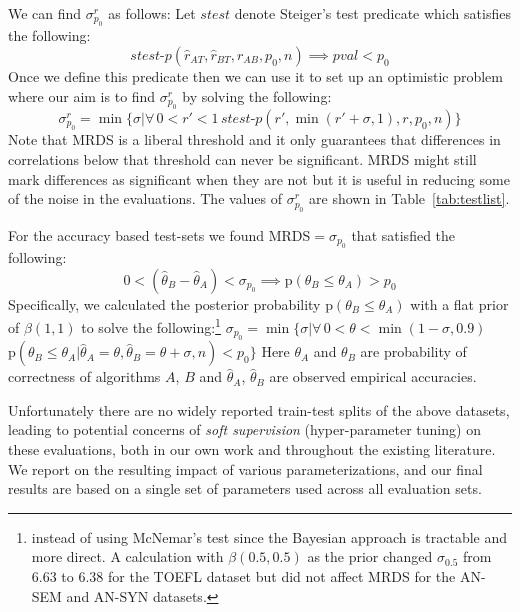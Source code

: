 \documentclass[11pt]{article}
\begin{document}
We can find $\sigma_{p_0}^r$ as follows: Let $\textit{stest}$
denote Steiger's test predicate which satisfies the following:
$$\textit{stest-p}(\hat{r}_{AT}, \hat{r}_{BT}, r_{AB}, p_0, n) {\implies} \textit{pval} < p_0$$
Once we define this predicate then we can use it to set up an optimistic problem where our aim is to find $\sigma_{p_0}^r$ by solving the following:
{\small $$\sigma_{p_0}^r = \min\{\sigma | \forall\, 0 {<} r' {<} 1\, \textit{stest-p}(r',
\min(r'+\sigma, 1), r, p_0, n) \} $$}
Note that MRDS is a liberal threshold and it only guarantees that
differences in correlations below that threshold can never be
significant. MRDS might still mark differences as significant
when they are not but it is useful in reducing some of the noise in
the evaluations.  The values of $\sigma_{p_0}^r$ are shown in
Table~\ref{tab:testlist}.

For the accuracy based test-sets we found MRDS$=\sigma_{p_0}$ that satisfied
the following:
{\small $$ 0< (\hat{\theta}_{B} - \hat{\theta}_{A})<\sigma_{p_0}
  {\implies} \text{p}(\theta_{B} \le \theta_{A}) > p_0$$}
Specifically, we calculated the posterior probability
$\text{p}(\theta_{B} \le \theta_{A})$ with a flat prior of
$\beta(1,1)$ to solve the following:\footnote{instead of using  McNemar's test
  \cite{mcnemar1947note} since the Bayesian approach is tractable and
  more direct. A calculation with $\beta(0.5, 0.5)$ as the prior
  changed $\sigma_{0.5}$ from 6.63 to 6.38 for the TOEFL dataset but
  did not affect MRDS for the AN-SEM and AN-SYN datasets.}
{\small $\sigma_{p_0}=\min\{\sigma |\forall\,
  0{<}\theta{<}\min(1{-}\sigma,0.9)\,$
  $\text{p}(\theta_{B}{\le} \theta_{A}| \hat{\theta}_A{=}\theta,
\hat{\theta}_B{=}\theta+\sigma, n) < p_0\}$}
Here $\theta_{A}$ and $\theta_{B}$ are probability of correctness of
algorithms $A$, $B$ and $\hat{\theta}_{A}$, $\hat{\theta}_{B}$ are
observed empirical accuracies.

Unfortunately there are no widely reported train-test splits of the
above datasets, leading to potential concerns of \emph{soft
  supervision} (hyper-parameter tuning) on these evaluations, both in
our own work and throughout the existing literature.  We report on the
resulting impact of various parameterizations, and our final results
are based on a single set of parameters used across all evaluation
sets.

\end{document}

